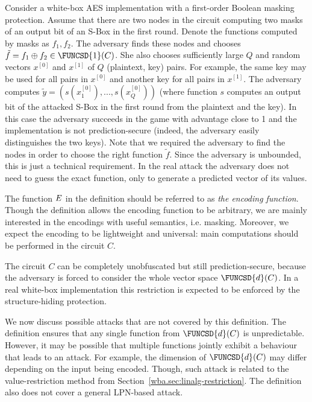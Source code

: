 \begin{example}
Consider a white-box AES implementation with a first-order Boolean masking protection. Assume that there are two nodes in the circuit computing two masks of an output bit of an S-Box in the first round. Denote the functions computed by masks as $f_1, f_2$. The adversary finds these nodes and chooses $\tilde{f}=f_1\oplus f_2 \in \FUNCSD{1}(C)$. She also chooses sufficiently large $Q$ and random vectors $x^{[0]}$ and $x^{[1]}$ of $Q$ (plaintext, key) pairs. For example, the same key may be used for all pairs in $x^{[0]}$ and another key for all pairs in $x^{[1]}$. The adversary computes $\tilde{y} = (s(x^{[0]}_1), ...,s(x^{[0]}_Q))$ (where function $s$ computes an output bit of the attacked S-Box in the first round from the plaintext and the key). In this case the adversary succeeds in the game with advantage close to 1 and the implementation is not prediction-secure (indeed, the adversary easily distinguishes the two keys). Note that we required the adversary to find the nodes in order to choose the right function $\tilde{f}$. Since the adversary is unbounded, this is just a technical requirement. In the real attack the adversary does not need to guess the exact function, only to generate a predicted vector of its values.
\end{example}

The function $E$ in the definition should be referred to as \emph{the encoding function}. Though the definition allows the encoding function to be arbitrary, we are mainly interested in the encodings with useful semantics, i.e. masking. Moreover, we expect the encoding to be lightweight and universal: main computations should be performed in the circuit $C$.

The circuit $C$ can be completely unobfuscated but still prediction-secure, because the adversary is forced to consider the whole vector space $\FUNCSD{d}(C)$. In a real white-box implementation this restriction is expected to be enforced by the structure-hiding protection.

We now discuss possible attacks that are not covered by this definition. The definition ensures that any single function from $\FUNCSD{d}(C)$ is unpredictable. However, it may be possible that multiple functions jointly exhibit a behaviour that leads to an attack. For example, the dimension of $\FUNCSD{d}(C)$ may differ depending on the input being encoded. Though, such attack is related to the value-restriction method from Section~\ref{wba.sec:linalg-restriction}. The definition also does not cover a general LPN-based attack.

